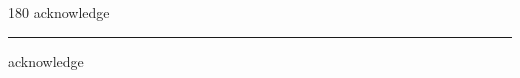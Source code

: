 
\begin{frame}
\begin{center}
\begin{turn}{180}
{\fontsize{2.5cm}{1em}\selectfont acknowledge}
\end{turn}
\vspace{1em}\par  
\hrule
\vspace{1em}\par  
{\fontsize{2.5cm}{1em}\selectfont acknowledge}
\end{center}
\end{frame}
